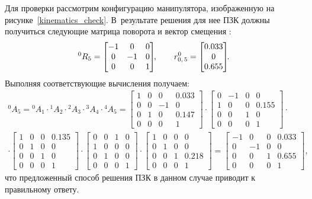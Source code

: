 Для проверки рассмотрим конфигурацию манипулятора, изображенную на рисунке~\ref{kinematics_check}.
В~результате решения для нее ПЗК должны получиться следующие матрица поворота и вектор смещения :
\begin{equation}
	{}^{0}R_5 =
	\begin{bmatrix}
		-1 &  0 & 0\\
		 0 & -1 & 0\\
		 0 &  0 & 1
	\end{bmatrix}\!\!,
	\qquad
	r^{0}_{0,\,5} =
	\begin{bmatrix}
		0.033\\
		0\\
		0.655 
	\end{bmatrix}\!\!\ldotp
\end{equation}
Выполняя соответствующие вычисления получаем:
\begin{multline}
    {}^{0}A_5 = {}^{0}A_1 \cdot {}^{1}A_2 \cdot {}^{2}A_3 \cdot {}^{3}A_4 \cdot {}^{4}A_5 =
    \begin{bmatrix}
        1 & 0 &  0 & 0.033\\
        0 & 0 & -1 &     0\\
        0 & 1 &  0 & 0.147\\
        0 & 0 &  0 &     1
    \end{bmatrix}
    \cdot
    \begin{bmatrix}
        0 & -1 &  0 &     0\\
        1 &  0 &  0 & 0.155\\
        0 &  0 &  1 &     0\\
        0 &  0 &  0 &     1
    \end{bmatrix}
    \cdot \\ \cdot
    \begin{bmatrix}
        1 & 0 &  0 & 0.135\\
        0 & 1 &  0 &     0\\
        0 & 0 &  1 &     0\\
        0 & 0 &  0 &     1
    \end{bmatrix}
    \cdot
    \begin{bmatrix}
        0 & 0 & 1 & 0\\
        1 & 0 & 0 & 0\\
        0 & 1 & 0 & 0\\
        0 & 0 & 0 & 1
    \end{bmatrix}
    \cdot
     \begin{bmatrix}
        1 & 0 &  0 &     0\\
        0 & 1 &  0 &     0\\
        0 & 0 &  1 & 0.218\\
        0 & 0 &  0 &     1
    \end{bmatrix}
    =
    \left[\begin{matrix}-1 & 0 & 0 & 0.033\\0 & -1 & 0 & 0\\0 & 0 & 1 & 0.655\\0 & 0 & 0 & 1\end{matrix}\right]\!\!,
\end{multline}
что предложенный способ решения ПЗК в данном случае приводит к правильному ответу.

